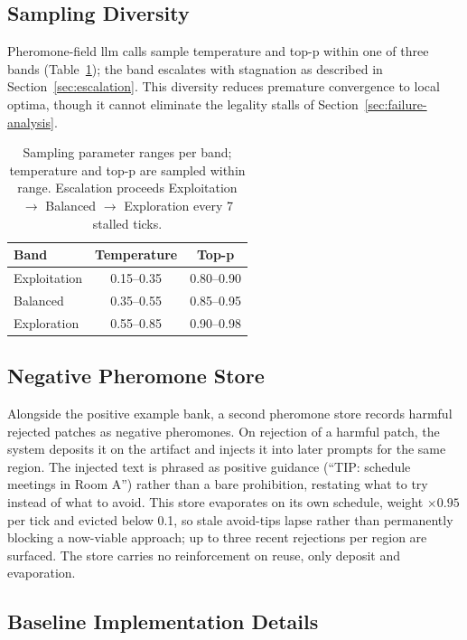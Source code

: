 \subsection{Sampling Diversity}

Pheromone-field \ac{llm} calls sample temperature and top-p within one of three bands (Table~\ref{tab:bands}); the band escalates with stagnation as described in Section~\ref{sec:escalation}. This diversity reduces premature convergence to local optima, though it cannot eliminate the legality stalls of Section~\ref{sec:failure-analysis}.

\begin{table}[htbp]
\centering
\small
\begin{tabular}{@{}lcc@{}}
\toprule
\textbf{Band} & \textbf{Temperature} & \textbf{Top-p} \\
\midrule
Exploitation & 0.15--0.35 & 0.80--0.90 \\
Balanced & 0.35--0.55 & 0.85--0.95 \\
Exploration & 0.55--0.85 & 0.90--0.98 \\
\bottomrule
\end{tabular}
\caption{Sampling parameter ranges per band; temperature and top-p are sampled within range. Escalation proceeds Exploitation $\to$ Balanced $\to$ Exploration every 7 stalled ticks.}
\label{tab:bands}
\end{table}

\subsection{Negative Pheromone Store}

Alongside the positive example bank, a second pheromone store records harmful rejected patches as negative pheromones. On rejection of a harmful patch, the system deposits it on the artifact and injects it into later prompts for the same region. The injected text is phrased as positive guidance (``TIP: schedule meetings in Room A'') rather than a bare prohibition, restating what to try instead of what to avoid. This store evaporates on its own schedule, weight $\times 0.95$ per tick and evicted below 0.1, so stale avoid-tips lapse rather than permanently blocking a now-viable approach; up to three recent rejections per region are surfaced. The store carries no reinforcement on reuse, only deposit and evaporation.

\subsection{Baseline Implementation Details}

